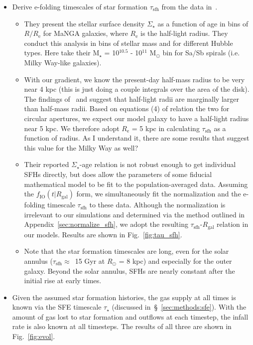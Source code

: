 \documentclass[a4paper, fleqn, usenatbib, useAMS]{mnras}
\begin{document}
\begin{itemize}
	\item Derive e-folding timescales of star formation $\tau_\text{sfh}$ 
	from the data in~\citet{Sanchez2020}. 
	\begin{itemize} 
		\item They present the stellar surface density $\Sigma_\star$ as a 
		function of age in bins of $R/R_\text{e}$ for MaNGA galaxies, where 
		$R_\text{e}$ is the half-light radius. They conduct this analysis in 
		bins of stellar mass and for different Hubble types. Here take their 
		M$_\star$ = 10$^{10.5}$ - 10$^{11}$ M$_\odot$ bin for Sa/Sb spirals 
		(i.e. Milky Way-like galaxies). 

		\item With our gradient, we know the present-day half-mass radius to be 
		very near 4 kpc (this is just doing a couple integrals over the area of 
		the disk). The findings of~\citet{Garcia-Benito2017} and 
		\citet{GonzalezDelgado2014} suggest that half-light radii are 
		marginally larger than half-mass radii. Based on equations (4) of 
		\citet{GonzalezDelgado2014} relation the two for circular apertures, 
		we expect our model galaxy to have a half-light radius near 5 kpc. We 
		therefore adopt $R_\text{e}$ = 5 kpc in calculating $\tau_\text{sfh}$ 
		as a function of radius. {\color{red} As I understand it, there are 
		some results that suggest this value for the Milky Way as well?} 

		\item Their reported $\Sigma_\star$-age relation is not robust enough 
		to get individual SFHs directly, but does allow the parameters of some 
		fiducial mathematical model to be fit to the population-averaged data. 
		Assuming the $f_\text{IO}(t|R_\text{gal})$ form, we simultaneously fit 
		the normalization and the e-folding timescale $\tau_\text{sfh}$ to 
		these data. Although the normalization is irrelevant to our simulations 
		and determined via the method outlined in 
		Appendix~\ref{sec:normalize_sfh}, we adopt the resulting 
		$\tau_\text{sfh}$-$R_\text{gal}$ relation in our models. Results are 
		shown in Fig.~\ref{fig:tau_sfh}. 

		\item Note that the star formation timescales are long, even for the 
		solar annulus ($\tau_\text{sfh} \approx$~15 Gyr at $R_\odot$ = 8 kpc) 
		and especially for the outer galaxy. Beyond the solar annulus, SFHs are 
		nearly constant after the initial rise at early times. 
	\end{itemize} 

	\item Given the assumed star formation histories, the gas supply at all 
	times is known via the SFE timescale $\tau_\star$ (discussed 
	in~\S~\ref{sec:methods:sfe}). With the amount of gas lost to star formation 
	and outflows at each timestep, the infall rate is also known at all 
	timesteps. The results of all three are shown in Fig.~\ref{fig:evol}. 
\end{itemize} 
\end{document}
